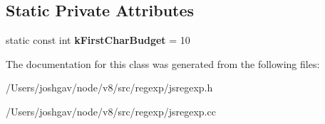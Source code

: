 \subsection*{Static Private Attributes}
\begin{DoxyCompactItemize}
\item 
static const int {\bfseries k\+First\+Char\+Budget} = 10\hypertarget{classv8_1_1internal_1_1_reg_exp_node_af28889602c9ab46365f8959ef1cc0b95}{}\label{classv8_1_1internal_1_1_reg_exp_node_af28889602c9ab46365f8959ef1cc0b95}

\end{DoxyCompactItemize}


The documentation for this class was generated from the following files\+:\begin{DoxyCompactItemize}
\item 
/\+Users/joshgav/node/v8/src/regexp/jsregexp.\+h\item 
/\+Users/joshgav/node/v8/src/regexp/jsregexp.\+cc\end{DoxyCompactItemize}
